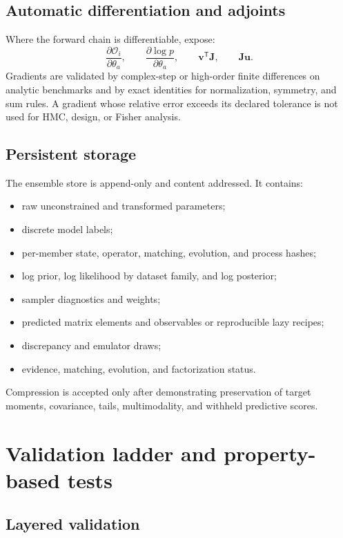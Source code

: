 \documentclass[11pt]{article}
\newcommand{\cO}{\mathcal O}
\begin{document}
\subsection{Automatic differentiation and adjoints}

Where the forward chain is differentiable, expose:
\begin{equation}
 \frac{\partial\cO_i}{\partial\theta_a},
 \qquad
 \frac{\partial\log p}{\partial\theta_a},
 \qquad
 \bm v^{\mathsf T}\bm J,
 \qquad
 \bm J\bm u .
 \label{eq:ad-contract}
\end{equation}
Gradients are validated by complex-step or high-order finite differences on
analytic benchmarks and by exact identities for normalization, symmetry, and
sum rules.  A gradient whose relative error exceeds its declared tolerance is
not used for HMC, design, or Fisher analysis.

\subsection{Persistent storage}

The ensemble store is append-only and content addressed.  It contains:
\begin{itemize}
\item raw unconstrained and transformed parameters;
\item discrete model labels;
\item per-member state, operator, matching, evolution, and process hashes;
\item log prior, log likelihood by dataset family, and log posterior;
\item sampler diagnostics and weights;
\item predicted matrix elements and observables or reproducible lazy recipes;
\item discrepancy and emulator draws;
\item evidence, matching, evolution, and factorization status.
\end{itemize}
Compression is accepted only after demonstrating preservation of target
moments, covariance, tails, multimodality, and withheld predictive scores.

\section{Validation ladder and property-based tests}
\label{sec:validation-ladder}

\subsection{Layered validation}
\end{document}
